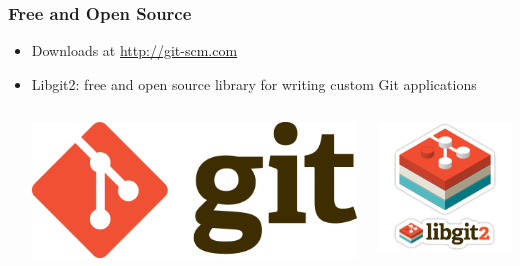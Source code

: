 \documentclass[english,compress]{beamer}
\begin{document}
\frame
{
    \frametitle{Free and Open Source}

    \begin{itemize}
        \item Downloads at \url{http://git-scm.com}
        \item Libgit2: free and open source library for writing custom Git applications
        \begin{columns}
            \begin{column}{.5\textwidth}
                \begin{center}
                    \includegraphics[width=1\textwidth]{figs/git-logo1.png}
                \end{center}
            \end{column}
            \begin{column}{.5\textwidth}
                \begin{center}
                    \includegraphics[width=1\textwidth]{figs/libgit-logo.png}
                \end{center}
            \end{column}
        \end{columns}
    \end{itemize}
}
\end{document}
